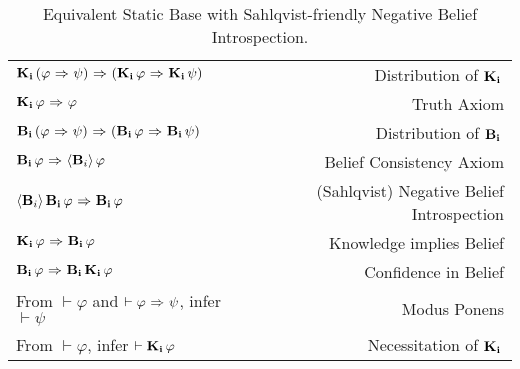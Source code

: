 \begin{table}[H]
	\begin{center}
		\begin{tabular}{| l r |}
			\hline
			$\mathbf{K}_{\mathbf{i}}\,(\varphi {\ \Rightarrow \ } \psi) {\ \Rightarrow \ } (\mathbf{K}_{\mathbf{i}}\,\varphi {\ \Rightarrow \ } \mathbf{K}_{\mathbf{i}}\,\psi)$ & Distribution of $\mathbf{K}_{\mathbf{i}}\,$ \\
			$\mathbf{K}_{\mathbf{i}}\,\varphi {\ \Rightarrow \ } \varphi$ & Truth Axiom \\
			$\mathbf{B}_{\mathbf{i}}\,(\varphi {\ \Rightarrow \ } \psi) {\ \Rightarrow \ } (\mathbf{B}_{\mathbf{i}}\,\varphi {\ \Rightarrow \ } \mathbf{B}_{\mathbf{i}}\,\psi)$ & Distribution of $\mathbf{B}_{\mathbf{i}}\,$\\
			$\mathbf{B}_{\mathbf{i}}\,\varphi {\ \Rightarrow \ } \langle \mathbf{B}_{i} \rangle\,\varphi$ & Belief Consistency Axiom\\
			$\langle \mathbf{B}_{i} \rangle\,\mathbf{B}_{\mathbf{i}}\,\varphi {\ \Rightarrow \ } \mathbf{B}_{\mathbf{i}}\,\varphi$ & (Sahlqvist) Negative Belief Introspection\\
			$\mathbf{K}_{\mathbf{i}}\,\varphi {\ \Rightarrow \ } \mathbf{B}_{\mathbf{i}}\,\varphi$ & Knowledge implies Belief \\
			$\mathbf{B}_{\mathbf{i}}\,\varphi {\ \Rightarrow \ } \mathbf{B}_{\mathbf{i}}\,\mathbf{K}_{\mathbf{i}}\,\varphi$ & Confidence in Belief\\
			From $\vdash \varphi$ and $\vdash \varphi {\ \Rightarrow \ } \psi$, infer $\vdash\psi$ & Modus Ponens\\
			From $\vdash \varphi$, infer $\vdash \mathbf{K}_{\mathbf{i}}\,\varphi$ & Necessitation of $\mathbf{K}_{\mathbf{i}}\,$\\
			\hline
		\end{tabular}
		\caption{Equivalent Static Base with Sahlqvist-friendly Negative Belief Introspection.}
	\end{center}
\end{table}




